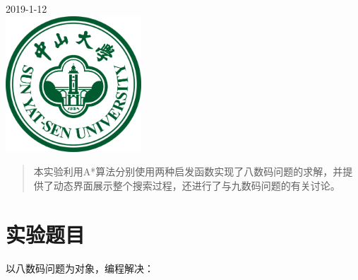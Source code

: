 \begin{titlepage}


{\large 2019-1-12}\\[1cm] %


\includegraphics[width=2in]{logo.png}\\[0.5cm] %
 

\vfill %

\end{titlepage}


\begin{abstract}
本实验利用A*算法分别使用两种启发函数实现了八数码问题的求解，并提供了动态界面展示整个搜索过程，还进行了与九数码问题的有关讨论。
\end{abstract}

\section{实验题目}

以八数码问题为对象，编程解决：

